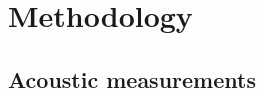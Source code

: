\documentclass[12pt, letterpaper]{article}
\begin{document}
\section{Methodology} \label{sec:Methods}


\subsection{Acoustic measurements} \label{sec:Acoustics}



\end{document}
